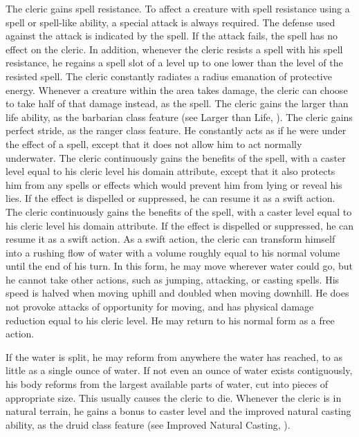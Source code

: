  The cleric gains spell resistance. To affect a creature with spell resistance using a spell or spell-like ability, a special attack is always required. The defense used against the attack is indicated by the spell. If the attack fails, the spell has no effect on the cleric. In addition, whenever the cleric resists a spell with his spell resistance, he regains a spell slot of a level up to one lower than the level of the resisted spell.
 The cleric constantly radiates a \areamed radius emanation of protective energy. Whenever a creature within the area takes damage, the cleric can choose to take half of that damage instead, as the  spell.
 The cleric gains the larger than life ability, as the barbarian class feature (see Larger than Life, ).
 The cleric gains perfect stride, as the ranger class feature. He constantly acts as if he were under the effect of a  spell, except that it does not allow him to act normally underwater.
 The cleric continuously gains the benefits of the  spell, with a caster level equal to his cleric level \add his domain attribute, except that it also protects him from any spells or effects which would prevent him from lying or reveal his lies. If the effect is dispelled or suppressed, he can resume it as a swift action.
 The cleric continuously gains the benefits of the  spell, with a caster level equal to his cleric level \add his domain attribute. If the effect is dispelled or suppressed, he can resume it as a swift action.
 As a swift action, the cleric can transform himself into a rushing flow of water with a volume roughly equal to his normal volume until the end of his turn. In this form, he may move wherever water could go, but he cannot take other actions, such as jumping, attacking, or casting spells. His speed is halved when moving uphill and doubled when moving downhill. He does not provoke attacks of opportunity for moving, and has physical damage reduction equal to his cleric level. He may return to his normal form as a free action.
\par If the water is split, he may reform from anywhere the water has reached, to as little as a single ounce of water. If not even an ounce of water exists contiguously, his body reforms from the largest available parts of water, cut into pieces of appropriate size. This usually causes the cleric to die.
 Whenever the cleric is in natural terrain, he gains a  bonus to caster level and the improved natural casting ability, as the druid class feature (see Improved Natural Casting, ).

